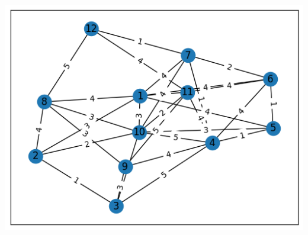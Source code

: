 \documentclass{article}
\begin{document}
\begin{center}
  \includegraphics*{1.png}
\end{center}
\end{document}
